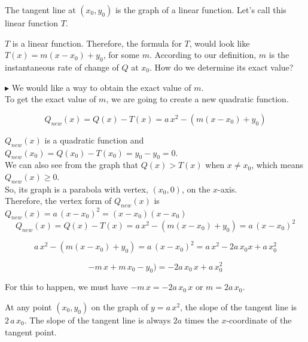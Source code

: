 \documentclass{ximera}
\begin{document}
\begin{explanation}

The tangent line at $(x_0, y_0)$ is the graph of a linear function. Let's call this linear function $T$.


$T$ is a linear function. Therefore, the formula for $T$, would look like $T(x) = m(x - x_0) + y_0$, for some $m$.  According to our definition, $m$ is the instantaneous rate of change of $Q$ at $x_0$.  How do we determine its exact value?


$\blacktriangleright$ We would like a way to obtain the exact value of $m$. \\



To get the exact value of $m$, we are going to create a new quadratic function.



\[
Q_{new}(x) = Q(x) - T(x) = a \, x^2 - (m(x - x_0) + y_0)
\]



$Q_{new}(x)$ is a quadratic function and $Q_{new}(x_0) = Q(x_0) - T(x_0) = y_0 - y_0 = 0$. \\

We can also see from the graph that $Q(x) > T(x)$ when $x \ne x_0$, which means $Q_{new}(x) \geq 0$.\\


So, its graph is a parabola with vertex, $(x_0, 0)$, on the $x$-axis.  \\


Therefore, the vertex form of $Q_{new}(x)$ is $Q_{new}(x) = a \, (x - x_0)^2 = (x - x_0)(x - x_0)$  \\






\[
Q_{new}(x) = Q(x) - T(x) = a \, x^2 - (m(x - x_0) + y_0) = a \, (x - x_0)^2
\]




\[
a \, x^2 - (m(x - x_0) + y_0) = a \, (x - x_0)^2 = a \, x^2 - 2a \, x_0 x + a \, x_0^2
\]



\[
 -m \, x + m \, x_0 - y_0) =   - 2a \, x_0 \, x + a \, x_0^2
\]


For this to happen, we must have $-m \, x = - 2a \, x_0 \, x$ or \textbf{$m = 2a \, x_0$}. \\


\end{explanation}

At any point $(x_0, y_0)$ on the graph of $y = a \, x^2$, the slope of the tangent line is $2 \, a \, x_0$.  The slope of the tangent line is always $2a$ times the $x$-coordinate of the tangent point.
\end{document}
